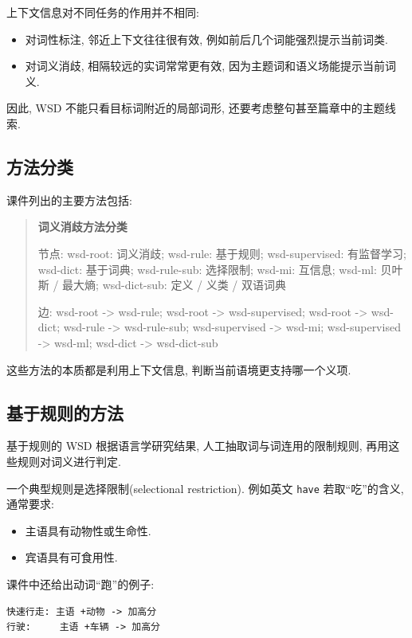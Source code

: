 上下文信息对不同任务的作用并不相同:

\begin{itemize}
\item 对词性标注, 邻近上下文往往很有效, 例如前后几个词能强烈提示当前词类.
\item 对词义消歧, 相隔较远的实词常常更有效, 因为主题词和语义场能提示当前词义.
\end{itemize}

因此, WSD 不能只看目标词附近的局部词形, 还要考虑整句甚至篇章中的主题线索.

\subsection{方法分类}


课件列出的主要方法包括:

\begin{quote}
\small
\textbf{词义消歧方法分类}
\par 节点: wsd-root: 词义消歧; wsd-rule: 基于规则; wsd-supervised: 有监督学习; wsd-dict: 基于词典; wsd-rule-sub: 选择限制; wsd-mi: 互信息; wsd-ml: 贝叶斯 / 最大熵; wsd-dict-sub: 定义 / 义类 / 双语词典
\par 边: wsd-root -\textgreater{} wsd-rule; wsd-root -\textgreater{} wsd-supervised; wsd-root -\textgreater{} wsd-dict; wsd-rule -\textgreater{} wsd-rule-sub; wsd-supervised -\textgreater{} wsd-mi; wsd-supervised -\textgreater{} wsd-ml; wsd-dict -\textgreater{} wsd-dict-sub
\end{quote}

这些方法的本质都是利用上下文信息, 判断当前语境更支持哪一个义项.

\subsection{基于规则的方法}


基于规则的 WSD 根据语言学研究结果, 人工抽取词与词连用的限制规则,
再用这些规则对词义进行判定.

一个典型规则是选择限制(selectional restriction).
例如英文 \texttt{have} 若取“吃”的含义, 通常要求:

\begin{itemize}
\item 主语具有动物性或生命性.
\item 宾语具有可食用性.
\end{itemize}

课件中还给出动词“跑”的例子:

\begin{Verbatim}[breaklines=true,breakanywhere=true,fontsize=\small]
快速行走: 主语 +动物 -> 加高分
行驶:     主语 +车辆 -> 加高分
\end{Verbatim}

